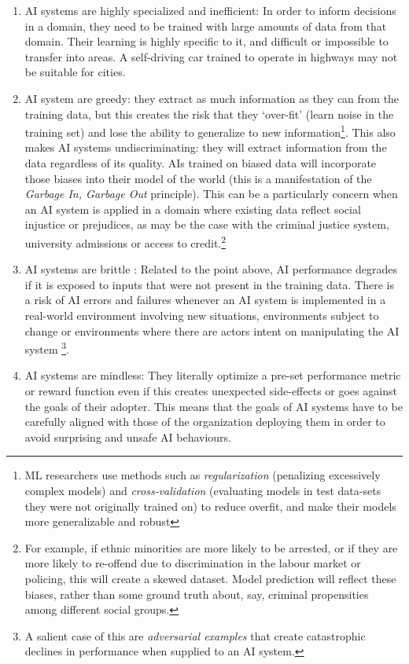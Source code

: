 \documentclass[11pt]{article}
\begin{document}
\begin{enumerate}
    \item AI systems are highly specialized and inefficient: In order to inform decisions in a domain, they need to be trained with large amounts of data from that domain. Their learning is highly specific to it, and difficult or impossible to transfer into areas. A self-driving car trained to operate in highways may not be suitable for cities.
    \item AI system are greedy: they extract as much information as they can from the training data, but this creates the risk that they `over-fit' (learn noise in the training set) and lose the ability to generalize to new information\footnote{ML researchers use methods such as \textit{regularization} (penalizing excessively complex models) and \textit{cross-validation} (evaluating models in test data-sets they were not originally trained on) to reduce overfit, and make their models more generalizable and robust}. This also makes AI systems undiscriminating: they will extract information from the data regardless of its quality. AIs trained on biased data will incorporate those biases into their model of the world (this is a manifestation of the \textit{Garbage In, Garbage Out} principle). This can be a particularly concern when an AI system is applied in a domain where existing data reflect social injustice or prejudices, as may be the case with the criminal justice system, university admissions or access to credit.\footnote{For example, if ethnic minorities are more likely to be arrested, or if they are more likely to re-offend due to discrimination in the labour market or policing, this will create a skewed dataset. Model prediction will reflect these biases, rather than some ground truth about, say, criminal propensities among different social groups.}  
    \item AI systems are brittle : Related to the point above, AI performance degrades if it is exposed to inputs that were not present in the training data. There is a risk of AI errors and failures whenever an AI system is implemented in a real-world environment involving new situations, environments subject to change or environments where there are actors intent on manipulating the AI system \footnote{A salient case of this are \textit{adversarial examples} that create catastrophic declines in performance when supplied to an AI system.}.
    \item AI systems are mindless: They literally optimize a pre-set performance metric or reward function even if this creates unexpected side-effects or goes against the goals of their adopter. This means that the goals of AI systems have to be carefully aligned with those of the organization deploying them in order to avoid surprising and unsafe AI behaviours.

\end{enumerate}
\end{document}

